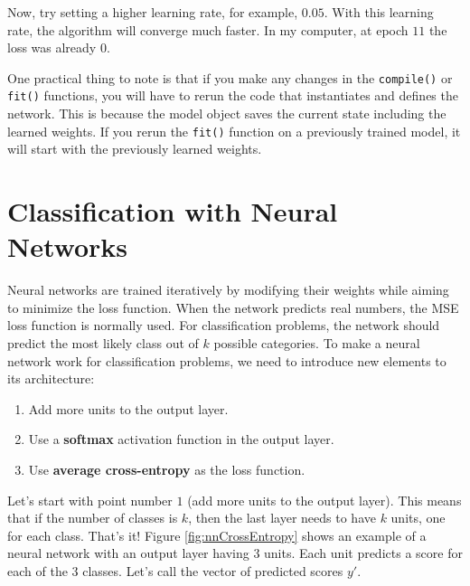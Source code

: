\documentclass[
  11pt,
]{krantz}
\makeatletter
\providecommand{\tightlist}{%
  \setlength{\itemsep}{0pt}\setlength{\parskip}{0pt}}
\newenvironment{kframe}{%
\medskip{}
\setlength{\fboxsep}{.8em}
 \def\at@end@of@kframe{}%
 \ifinner\ifhmode%
  \def\at@end@of@kframe{\end{minipage}}%
  \begin{minipage}{\columnwidth}%
 \fi\fi%
 \def\FrameCommand##1{\hskip\@totalleftmargin \hskip-\fboxsep
 \colorbox{shadecolor}{##1}\hskip-\fboxsep
     \hskip-\linewidth \hskip-\@totalleftmargin \hskip\columnwidth}%
 \MakeFramed {\advance\hsize-\width
   \@totalleftmargin\z@ \linewidth\hsize
   \@setminipage}}%
 {\par\unskip\endMakeFramed%
 \at@end@of@kframe}
\newenvironment{rmdblock}[1]
  {
  \begin{itemize}
  \renewcommand{\labelitemi}{
    \raisebox{-.7\height}[0pt][0pt]{
      {\setkeys{Gin}{width=3em,keepaspectratio}\texttt{[image: images/icons/\#1]}}
    }
  }
  \setlength{\fboxsep}{1em}
  \begin{kframe}
  \item
  }
  {
  \end{kframe}
  \end{itemize}
  }
\newenvironment{rmdcaution}
  {\begin{rmdblock}{caution}}
  {\end{rmdblock}}
\makeatother
\begin{document}
Now, try setting a higher learning rate, for example, \(0.05\). With this learning rate, the algorithm will converge much faster. In my computer, at epoch \(11\) the loss was already \(0\).

\begin{rmdcaution}
One practical thing to note is that if you make any changes in the \texttt{compile()} or \texttt{fit()} functions, you will have to rerun the code that instantiates and defines the network. This is because the model object saves the current state including the learned weights. If you rerun the \texttt{fit()} function on a previously trained model, it will start with the previously learned weights.
\end{rmdcaution}

\hypertarget{classification-with-neural-networks}{%
\section{Classification with Neural Networks}\label{classification-with-neural-networks}}

Neural networks are trained iteratively by modifying their weights while aiming to minimize the loss function. When the network predicts real numbers, the MSE loss function is normally used. For classification problems, the network should predict the most likely class out of \(k\) possible categories. To make a neural network work for classification problems, we need to introduce new elements to its architecture:

\begin{enumerate}
\def\labelenumi{\arabic{enumi}.}
\tightlist
\item
  Add more units to the output layer.
\item
  Use a \textbf{softmax} activation function in the output layer.
\item
  Use \textbf{average cross-entropy} as the loss function.
\end{enumerate}

Let's start with point number \(1\) (add more units to the output layer). This means that if the number of classes is \(k\), then the last layer needs to have \(k\) units, one for each class. That's it! Figure \ref{fig:nnCrossEntropy} shows an example of a neural network with an output layer having \(3\) units. Each unit predicts a score for each of the \(3\) classes. Let's call the vector of predicted scores \(y'\).
\end{document}
